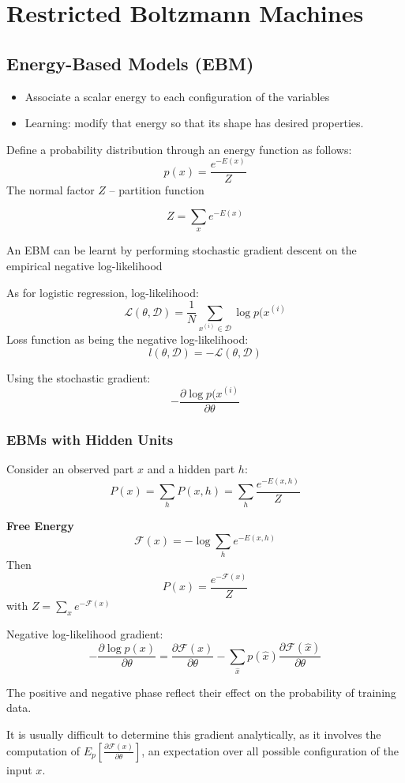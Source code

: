\chapter{Restricted Boltzmann Machines}
\section{Energy-Based Models (EBM)}
\begin{itemize}
    \item Associate a scalar energy to each configuration of the variables
    \item Learning: modify that energy so that its shape has desired
        properties.
\end{itemize}
Define a probability distribution through an energy function as follows:
\[
    p(x) = \frac{e^{-E(x)}}{Z}
\]
The normal factor $Z$ -- partition function

\[ Z = \sum_x e^{-E(x)}\]


An EBM can be learnt by performing stochastic gradient descent on the
empirical negative log-likelihood

As for logistic regression, log-likelihood:
\[ \mathcal{L}(\theta, \mathcal{D})  = \frac{1}{N} \sum_{x^{(i)}\in
\mathcal{D}}\log p(x^{(i)}\]
Loss function as being the negative log-likelihood:
\[ l(\theta, \mathcal{D}) = -\mathcal{L}(\theta, \mathcal{D})\]

Using the stochastic gradient: 
\[ - \frac{\partial \log p(x^{(i)}}{\partial \theta}\]
\subsection{EBMs with Hidden Units}
Consider an observed part $x$ and a hidden part $h$:
\[ P(x) = \sum_h P(x,h) = \sum_h \frac{e^{-E(x,h)}}{Z}\]

\textbf{Free Energy}
\[ \mathcal{F}(x) = -\log\sum_h e^{-E(x,h)}\]
Then
\[ P(x) = \frac{e^{-\mathcal{F}(x)}}{Z}
\]
with $Z = \sum_x e^{-\mathcal{F}(x)}$

Negative log-likelihood gradient:
\[ -\frac{\partial \log{p(x)}}{\partial \theta} = \frac{\partial
    \mathcal{F}(x)}{\partial \theta} -
    \sum_{\hat{x}}p(\hat{x})\frac{\partial\mathcal{F}(\hat{x})}{\partial
    \theta}
\]

The positive and negative phase reflect their effect on the probability of
training data.

It is usually difficult to determine this gradient analytically, as it
involves the computation of $E_p\left[ \frac{\partial
\mathcal{F}(x)}{\partial \theta} \right]$, an expectation over all
possible configuration of the input $x$.

